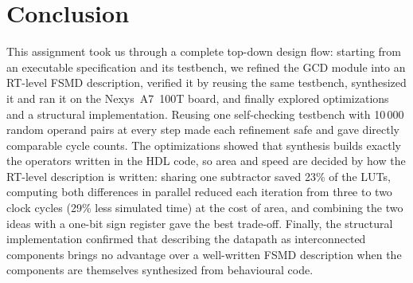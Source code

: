 \section{Conclusion}

This assignment took us through a complete top-down design flow: starting from an executable specification and its testbench, we refined the GCD module into an RT-level FSMD description, verified it by reusing the same testbench, synthesized it and ran it on the Nexys~A7~100T board, and finally explored optimizations and a structural implementation. Reusing one self-checking testbench with 10\,000 random operand pairs at every step made each refinement safe and gave directly comparable cycle counts. The optimizations showed that synthesis builds exactly the operators written in the HDL code, so area and speed are decided by how the RT-level description is written: sharing one subtractor saved 23\% of the LUTs, computing both differences in parallel reduced each iteration from three to two clock cycles (29\% less simulated time) at the cost of area, and combining the two ideas with a one-bit sign register gave the best trade-off. Finally, the structural implementation confirmed that describing the datapath as interconnected components brings no advantage over a well-written FSMD description when the components are themselves synthesized from behavioural code.

